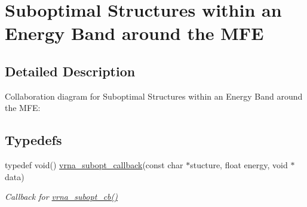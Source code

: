 \hypertarget{group__subopt__wuchty}{}\section{Suboptimal Structures within an Energy Band around the M\+FE}
\label{group__subopt__wuchty}


\subsection{Detailed Description}
Collaboration diagram for Suboptimal Structures within an Energy Band around the M\+FE\+:
\subsection*{Typedefs}
\begin{DoxyCompactItemize}
\item 
typedef void() \mbox{\hyperlink{group__subopt__wuchty_gaa0270c66d04f59e750401695b8282e04}{vrna\+\_\+subopt\+\_\+callback}}(const char $\ast$stucture, float energy, void $\ast$data)
\begin{DoxyCompactList}\small\item\em Callback for \mbox{\hyperlink{group__subopt__wuchty_ga1053837e6b6f158093508f8a70998352}{vrna\+\_\+subopt\+\_\+cb()}} \end{DoxyCompactList}\end{DoxyCompactItemize}
